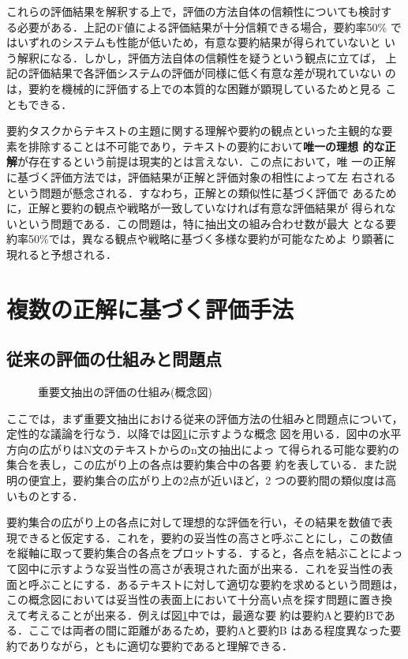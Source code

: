 これらの評価結果を解釈する上で，評価の方法自体の信頼性についても検討す
る必要がある．上記のF値による評価結果が十分信頼できる場合，要約率50\%
ではいずれのシステムも性能が低いため，有意な要約結果が得られていないと
いう解釈になる．しかし，評価方法自体の信頼性を疑うという観点に立てば，
上記の評価結果で各評価システムの評価が同様に低く有意な差が現れていない
のは，要約を機械的に評価する上での本質的な困難が顕現しているためと見る
こともできる．

要約タスクからテキストの主題に関する理解や要約の観点といった主観的な要
素を排除することは不可能であり，テキストの要約において{\bf 唯一の理想
的な正解}が存在するという前提は現実的とは言えない．この点において，唯
一の正解に基づく評価方法では，評価結果が正解と評価対象の相性によって左
右されるという問題が懸念される．すなわち，正解との類似性に基づく評価で
あるために，正解と要約の観点や戦略が一致していなければ有意な評価結果が
得られないという問題である．この問題は，特に抽出文の組み合わせ数が最大
となる要約率50\%では，異なる観点や戦略に基づく多様な要約が可能なためよ
り顕著に現れると予想される．


\section{複数の正解に基づく評価手法}

\subsection{従来の評価の仕組みと問題点}

\begin{figure}
\begin{center}
\caption{重要文抽出の評価の仕組み(概念図)}
\label{summary-adequacy}
\end{center}
\end{figure}

ここでは，まず重要文抽出における従来の評価方法の仕組みと問題点について，
定性的な議論を行なう．以降では図\ref{summary-adequacy}に示すような概念
図を用いる．図中の水平方向の広がりはN文のテキストからのn文の抽出によっ
て得られる可能な要約の集合を表し，この広がり上の各点は要約集合中の各要
約を表している．また説明の便宜上，要約集合の広がり上の2点が近いほど，2
つの要約間の類似度は高いものとする．

要約集合の広がり上の各点に対して理想的な評価を行い，その結果を数値で表
現できると仮定する．これを，要約の妥当性の高さと呼ぶことにし，この数値
を縦軸に取って要約集合の各点をプロットする．すると，各点を結ぶことによっ
て図中に示すような妥当性の高さが表現された面が出来る．これを妥当性の表
面と呼ぶことにする．あるテキストに対して適切な要約を求めるという問題は，
この概念図においては妥当性の表面上において十分高い点を探す問題に置き換
えて考えることが出来る．例えば図\ref{summary-adequacy}中では，最適な要
約は要約Aと要約Bである．ここでは両者の間に距離があるため，要約Aと要約B
はある程度異なった要約でありながら，ともに適切な要約であると理解できる．

